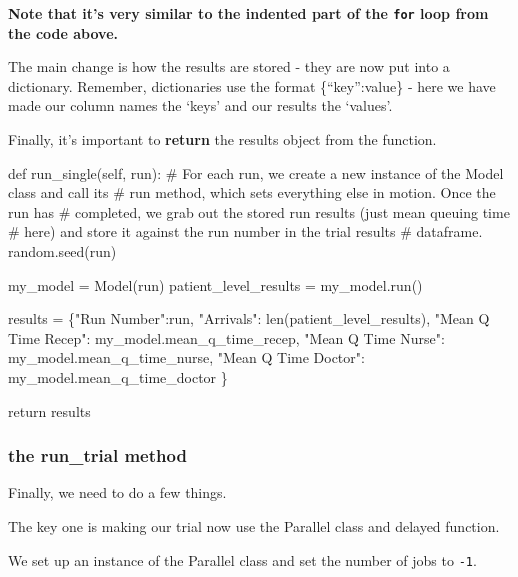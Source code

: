 \documentclass[
  letterpaper,
  DIV=11,
  numbers=noendperiod]{scrreprt}
\newenvironment{Shaded}{}{}
\newcommand{\BuiltInTok}[1]{\textcolor[rgb]{0.84,0.23,0.29}{#1}}
\newcommand{\CommentTok}[1]{\textcolor[rgb]{0.42,0.45,0.49}{#1}}
\newcommand{\ControlFlowTok}[1]{\textcolor[rgb]{0.84,0.23,0.29}{#1}}
\newcommand{\KeywordTok}[1]{\textcolor[rgb]{0.84,0.23,0.29}{#1}}
\newcommand{\NormalTok}[1]{\textcolor[rgb]{0.14,0.16,0.18}{#1}}
\newcommand{\OperatorTok}[1]{\textcolor[rgb]{0.14,0.16,0.18}{#1}}
\newcommand{\StringTok}[1]{\textcolor[rgb]{0.01,0.18,0.38}{#1}}
\newcommand{\VariableTok}[1]{\textcolor[rgb]{0.89,0.38,0.04}{#1}}
\begin{document}
\textbf{Note that it's very similar to the indented part of the
\texttt{for} loop from the code above.}

The main change is how the results are stored - they are now put into a
dictionary. Remember, dictionaries use the format \{``key'':value\} -
here we have made our column names the `keys' and our results the
`values'.

Finally, it's important to \textbf{return} the results object from the
function.

\begin{Shaded}
\begin{Highlighting}[]
\KeywordTok{def}\NormalTok{ run\_single(}\VariableTok{self}\NormalTok{, run):}
    \CommentTok{\# For each run, we create a new instance of the Model class and call its}
    \CommentTok{\# run method, which sets everything else in motion.  Once the run has}
    \CommentTok{\# completed, we grab out the stored run results (just mean queuing time}
    \CommentTok{\# here) and store it against the run number in the trial results}
    \CommentTok{\# dataframe.}
\NormalTok{    random.seed(run)}

\NormalTok{    my\_model }\OperatorTok{=}\NormalTok{ Model(run)}
\NormalTok{    patient\_level\_results }\OperatorTok{=}\NormalTok{ my\_model.run()}

\NormalTok{    results }\OperatorTok{=}\NormalTok{ \{}\StringTok{"Run Number"}\NormalTok{:run,}
        \StringTok{"Arrivals"}\NormalTok{: }\BuiltInTok{len}\NormalTok{(patient\_level\_results),}
        \StringTok{"Mean Q Time Recep"}\NormalTok{: my\_model.mean\_q\_time\_recep,}
        \StringTok{"Mean Q Time Nurse"}\NormalTok{: my\_model.mean\_q\_time\_nurse,}
        \StringTok{"Mean Q Time Doctor"}\NormalTok{: my\_model.mean\_q\_time\_doctor}
\NormalTok{        \}}

    \ControlFlowTok{return}\NormalTok{ results}
\end{Highlighting}
\end{Shaded}

\subsubsection{the run\_trial method}\label{the-run_trial-method-5}

Finally, we need to do a few things.

The key one is making our trial now use the Parallel class and delayed
function.

We set up an instance of the Parallel class and set the number of jobs
to \texttt{-1}.
\end{document}

